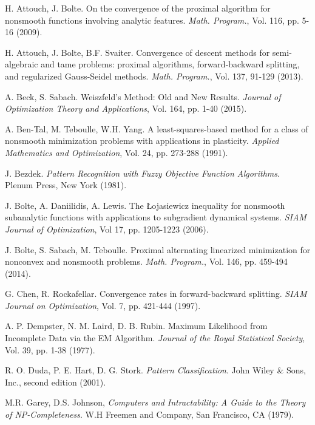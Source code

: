 \documentclass[12pt,a4paper]{report}
\begin{document}
\begin{thebibliography}{99}

 H. Attouch, J. Bolte. On the convergence of the proximal algorithm for nonsmooth functions involving analytic features. \emph{Math. Program.}, Vol. 116, pp. 5-16 (2009).


  H. Attouch, J. Bolte, B.F. Svaiter. Convergence of descent methods for semi-algebraic and tame problems: proximal algorithms, forward-backward splitting, and regularized Gauss-Seidel methods. \emph{Math. Program.}, Vol. 137, 91-129 (2013).


 A. Beck, S. Sabach. Weiszfeld's Method: Old and New Results. \emph{Journal of Optimization Theory and Applications}, Vol. 164, pp. 1-40 (2015).


 A. Ben-Tal, M. Teboulle, W.H. Yang. A least-squares-based method for a class of nonsmooth minimization problems with applications in plasticity.  \emph{Applied Mathematics and Optimization}, Vol. 24, pp. 273-288 (1991).


 J. Bezdek. \emph{Pattern Recognition with Fuzzy Objective Function Algorithms}. Plenum Press, New York (1981). 

 J. Bolte, A. Daniilidis, A. Lewis. The {\L}ojasiewicz inequality for nonsmooth subanalytic functions with applications to subgradient dynamical systems. \emph{SIAM Journal of Optimization}, Vol 17, pp. 1205-1223 (2006).


 J. Bolte, S. Sabach, M. Teboulle. Proximal alternating linearized minimization for nonconvex and nonsmooth problems. \emph{Math. Program.}, Vol. 146, pp. 459-494 (2014).


 G. Chen, R. Rockafellar. Convergence rates in forward-backward splitting. \emph{SIAM Journal on Optimization}, Vol. 7, pp. 421-444 (1997).


 A. P. Dempster, N. M. Laird, D. B. Rubin. Maximum Likelihood from Incomplete Data via the EM Algorithm. \emph{Journal of the Royal Statistical Society}, Vol. 39, pp. 1-38 (1977).


 R. O. Duda, P. E. Hart, D. G. Stork. \emph{Pattern Classification}. John Wiley \& Sons, Inc., second edition (2001).


 M.R. Garey, D.S. Johnson, \emph{Computers and Intractability: A Guide to the Theory of NP-Completeness}. W.H Freemen and Company, San Francisco, CA (1979).



\end{thebibliography}
\end{document}
